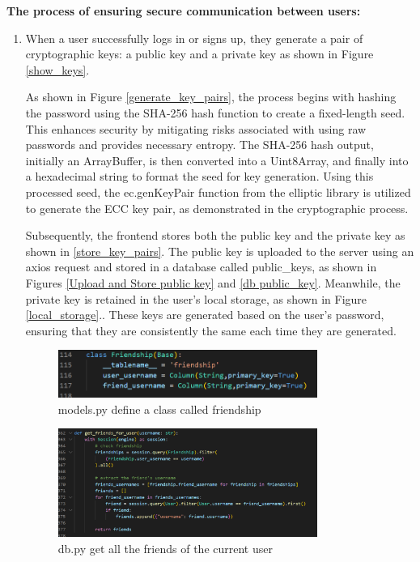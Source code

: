 \documentclass[12pt]{article}
\begin{document}
        \textbf{The process of ensuring secure communication between users:}
        \begin{enumerate}
            \item When a user successfully logs in or signs up, they generate a pair of cryptographic keys: a public key and a private key as shown in Figure \ref{show_keys}.

            As shown in Figure \ref{generate_key_pairs}, the process begins with hashing the password using the SHA-256 hash function to create a fixed-length seed. This enhances security by mitigating risks associated with using raw passwords and provides necessary entropy. The SHA-256 hash output, initially an ArrayBuffer, is then converted into a Uint8Array, and finally into a hexadecimal string to format the seed for key generation. Using this processed seed, the ec.genKeyPair function from the elliptic library is utilized to generate the ECC key pair, as demonstrated in the cryptographic process.

            Subsequently, the frontend stores both the public key and the private key as shown in \ref{store_key_pairs}. The public key is uploaded to the server using an axios request and stored in a database called public\_keys, as shown in Figures \ref{Upload and Store public key} and \ref{db public_key}. Meanwhile, the private key is retained in the user's local storage, as shown in Figure \ref{local_storage}.. These keys are generated based on the user's password, ensuring that they are consistently the same each time they are generated.

		\begin{figure}[H]
                \centering
                \includegraphics[width=0.8\textwidth]{zzrgraphs/models_friendship.png}
                \caption{models.py define a class called friendship}
                \label{friendshipClass}
            \end{figure}

		\begin{figure}[H]
                \centering
                \includegraphics[width=0.8\textwidth]{zzrgraphs/db_getfriendforuser.png}
                \caption{db.py get all the friends of the current user}
                \label{getfriends}
            \end{figure}


\end{enumerate}
\end{document}
